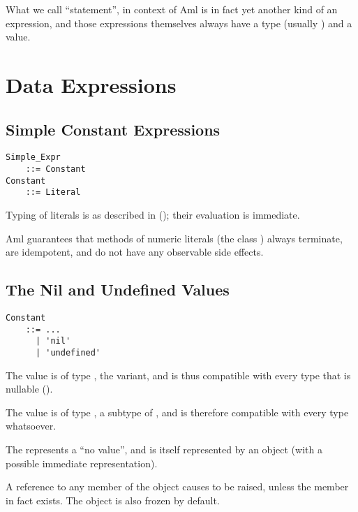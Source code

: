 What we call ``statement'', in context of Aml is in fact yet another kind of an expression, and those expressions themselves always have a type (usually ) and a value. 





\section{Data Expressions}





\subsection{Simple Constant Expressions}
\label{sec:literal-expr}

\grammar\begin{lstlisting}
Simple_Expr 
    ::= Constant
Constant
    ::= Literal
\end{lstlisting}

Typing of literals is as described in (); their evaluation is immediate. 

Aml guarantees that methods of numeric literals (the class ) always terminate, are idempotent, and do not have any observable side effects. 






\subsection{The Nil and Undefined Values}

\grammar\begin{lstlisting}
Constant 
    ::= ...
      | 'nil'
      | 'undefined'
\end{lstlisting}

The  value is of type , the  variant, and is thus compatible with every type that is nullable ().

The  value is of type , a subtype of , and is therefore compatible with every type whatsoever. 

The  represents a ``no value'', and is itself represented by an object (with a possible immediate representation). 

A reference to any member of the  object causes  to be raised, unless the member in fact exists. The  object is also frozen by default. 

